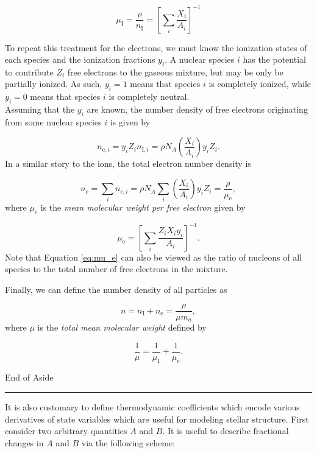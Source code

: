 \documentclass[12pt]{article}
\begin{document}
\begin{equation}
    \mu_\mathrm{I} = \frac{\rho}{n_\mathrm{I}} = \left[\sum_i \frac{X_i}{A_i} \right]^{-1}
\end{equation}

To repeat this treatment for the electrons, we must know the ionization states of each species and the ionization fractions $y_i$. A nuclear species $i$ has the potential to contribute $Z_i$ free electrons to the gaseous mixture, but may be only be partially ionized. As such, $y_i = 1$ means that species $i$ is completely ionized, while $y_i = 0$ means that species $i$ is completely neutral.\\

Assuming that the $y_i$ are known, the number density of free electrons originating from some nuclear species $i$ is given by 

\begin{equation}
    n_{\mathrm{e},i} = y_i Z_i n_{\mathrm{I},i} = \rho N_A \left(\frac{X_i}{A_i}\right) y_i Z_i.
\end{equation}
%
In a similar story to the ions, the total electron number density is

\begin{equation}
    n_\mathrm{e} = \sum_i n_{\mathrm{e},i} = \rho N_A \sum_i \left(\frac{X_i}{A_i}\right)y_i Z_i = \frac{\rho}{\mu_\mathrm{e}},
\end{equation}
%
where $\mu_\mathrm{e}$ is the \textit{mean molecular weight per free electron} given by

\begin{equation}
    \mu_\mathrm{e} = \left[ \sum_i \frac{Z_i X_i y_i}{A_i} \right]^{-1}. \label{eq:mu_e}
\end{equation}
%
Note that Equation \ref{eq:mu_e} can also be viewed as the ratio of nucleons of all species to the total number of free electrons in the mixture.

Finally, we can define the number density of all particles as

\begin{equation}
    n = n_\mathrm{I} + n_\mathrm{e} = \frac{\rho}{\mu m_a},
\end{equation}
%
where $\mu$ is the \textit{total mean molecular weight} defined by

\begin{equation}
    \frac{1}{\mu} = \frac{1}{\mu_\mathrm{I}} + \frac{1}{\mu_\mathrm{e}} .
\end{equation}

\begin{center}
    End of Aside
\end{center}
\hrule
\vspace{0.25cm}
It is also customary to define thermodynamic coefficients which encode various derivatives of state variables which are useful for modeling stellar structure. First consider two arbitrary quantities $A$ and $B$. It is useful to describe fractional changes in $A$ and $B$ via the following scheme:
\end{document}

